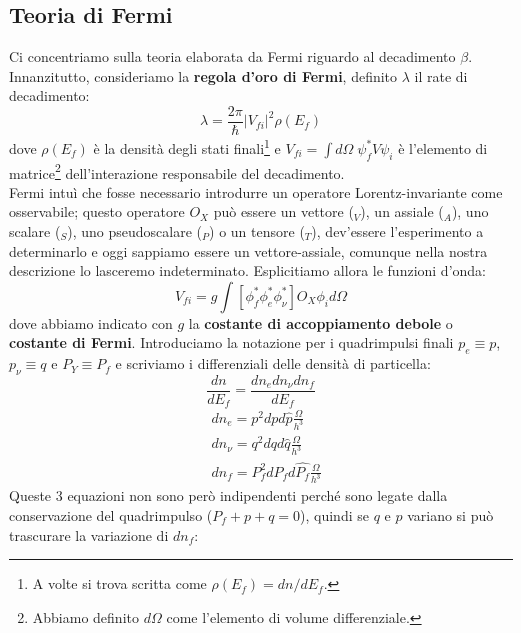 \newcommand{\tmez}{\tau_{1/2}}

\subsection{Teoria di Fermi}
Ci concentriamo sulla teoria elaborata da Fermi riguardo al decadimento $\beta$.\\
Innanzitutto, consideriamo la \textbf{regola d'oro di Fermi}, definito $\lambda$ il rate di decadimento:
$$\lambda = \frac{2\pi}{\hbar} |V_{fi}|^2 \rho(E_f)$$
dove $\rho(E_f)$ è la densità degli stati finali\footnote{A volte si trova scritta come $\rho(E_f)=dn/dE_f$.} e $V_{fi} = \int d\Omega \;\psi^*_f V \psi_i$ è l'elemento di matrice\footnote{Abbiamo definito $d\Omega$ come l'elemento di volume differenziale.} dell'interazione responsabile del decadimento.\\
Fermi intuì che fosse necessario introdurre un operatore Lorentz-invariante come osservabile; questo operatore $O_X$ può essere un vettore ($_V$), un assiale ($_A$), uno scalare ($_S$), uno pseudoscalare ($_P$) o un tensore ($_T$), dev'essere l'esperimento a determinarlo e oggi sappiamo essere un vettore-assiale, comunque nella nostra descrizione lo lasceremo indeterminato. Esplicitiamo allora le funzioni d'onda:
$$V_{fi} = g \int [\phi^*_f \phi^*_e \phi^*_\nu] O_X \phi_i d\Omega$$
dove abbiamo indicato con $g$ la \textbf{costante di accoppiamento debole} o \textbf{costante di Fermi}. Introduciamo la notazione per i quadrimpulsi finali $p_e\equiv p $, $p_\nu \equiv q$ e $P_Y \equiv P_f$ e scriviamo i differenziali delle densità di particella:
$$\frac{dn}{dE_f} = \frac{dn_edn_\nu dn_f}{dE_f}$$
\begin{displaymath}
\begin{aligned}
&dn_e = p^2 dp d\hat{p} \frac{\Omega}{h^3} \\
&dn_\nu = q^2 dq d\hat{q} \frac{\Omega}{h^3} \\
&dn_f = P_f^2 dP_f d\hat{P_f} \frac{\Omega}{h^3} 
\end{aligned}
\end{displaymath}
Queste 3 equazioni non sono però indipendenti perché sono legate dalla conservazione del quadrimpulso ($P_f+p+q =0$), quindi se $q$ e $p$ variano si può trascurare la variazione di $dn_f$:
